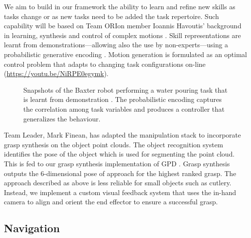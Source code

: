 \documentclass[runningheads,a4paper]{llncs}
\newcommand{\teamori}{Team ORIon}
\begin{document}
We aim to build in our framework the ability
to learn and refine new skills as tasks change or as new tasks need to be added
the task repertoire. Such capability will be based on \teamori{} 
member Ioannis Havoutis' background in learning, synthesis and control of 
complex motions \cite{Havoutis16SSRR}. Skill representations
are learnt from demonstrations---allowing also the use by non-experts---using a probabilistic generative encoding \cite{Havoutis17ICRA}. Motion generation is formulated as an optimal control problem that adapts to changing task configurations on-line \cite{Zeestraten17IROS,Zeestraten2017-RAL} (\url{https://youtu.be/NiRPE0egymk}).
\begin{figure}[!t]
	\centering
	\vspace{-10pt}%
	\caption{Snapshots of the Baxter robot performing a water pouring task that
	is learnt from demonstration \cite{Zeestraten2017-RAL}. The probabilistic
	encoding captures the correlation among task variables and produces a
	controller that generalizes the behaviour.}
	\label{fig:baxter_water_task}
	\vspace{-3ex}
\end{figure}
Team Leader, Mark Finean, has adapted the manipulation stack to incorporate grasp synthesis on the object point clouds. The object recognition system identifies the pose of the object which is used for segmenting the point cloud. This is fed to our grasp synthesis implementation of GPD \cite{GPD1} \cite{GPD2}. Grasp synthesis outputs the 6-dimensional pose of approach for the highest ranked grasp. The approach described as above is less reliable for small objects such as cutlery. Instead, we implement a custom visual feedback system that uses the in-hand camera to align and orient the end effector to ensure a successful grasp.  

\subsection{Navigation}\label{nav}
\end{document}
